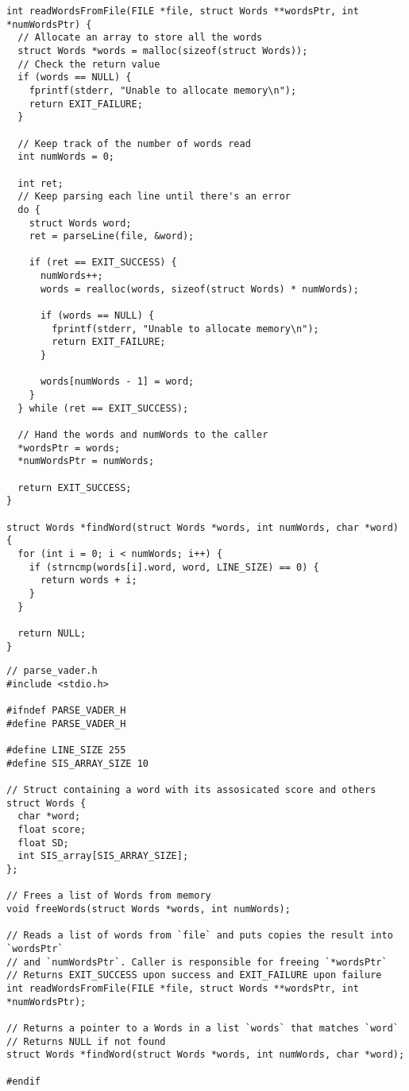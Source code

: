 \documentclass{article}
\theoremstyle{mytheoremstyle}
\theoremstyle{mytheoremstyle}
\theoremstyle{myproblemstyle}
\begin{document}
\begin{lstlisting}
int readWordsFromFile(FILE *file, struct Words **wordsPtr, int *numWordsPtr) {
  // Allocate an array to store all the words
  struct Words *words = malloc(sizeof(struct Words));
  // Check the return value
  if (words == NULL) {
    fprintf(stderr, "Unable to allocate memory\n");
    return EXIT_FAILURE;
  }

  // Keep track of the number of words read
  int numWords = 0;

  int ret;
  // Keep parsing each line until there's an error
  do {
    struct Words word;
    ret = parseLine(file, &word);

    if (ret == EXIT_SUCCESS) {
      numWords++;
      words = realloc(words, sizeof(struct Words) * numWords);

      if (words == NULL) {
        fprintf(stderr, "Unable to allocate memory\n");
        return EXIT_FAILURE;
      }

      words[numWords - 1] = word;
    }
  } while (ret == EXIT_SUCCESS);

  // Hand the words and numWords to the caller
  *wordsPtr = words;
  *numWordsPtr = numWords;

  return EXIT_SUCCESS;
}

struct Words *findWord(struct Words *words, int numWords, char *word) {
  for (int i = 0; i < numWords; i++) {
    if (strncmp(words[i].word, word, LINE_SIZE) == 0) {
      return words + i;
    }
  }

  return NULL;
}
    \end{lstlisting}

    \begin{lstlisting}
// parse_vader.h
#include <stdio.h>

#ifndef PARSE_VADER_H
#define PARSE_VADER_H

#define LINE_SIZE 255
#define SIS_ARRAY_SIZE 10

// Struct containing a word with its assosicated score and others
struct Words {
  char *word;
  float score;
  float SD;
  int SIS_array[SIS_ARRAY_SIZE];
};

// Frees a list of Words from memory
void freeWords(struct Words *words, int numWords);

// Reads a list of words from `file` and puts copies the result into `wordsPtr`
// and `numWordsPtr`. Caller is responsible for freeing `*wordsPtr`
// Returns EXIT_SUCCESS upon success and EXIT_FAILURE upon failure
int readWordsFromFile(FILE *file, struct Words **wordsPtr, int *numWordsPtr);

// Returns a pointer to a Words in a list `words` that matches `word`
// Returns NULL if not found
struct Words *findWord(struct Words *words, int numWords, char *word);

#endif
    \end{lstlisting}
\end{document}
